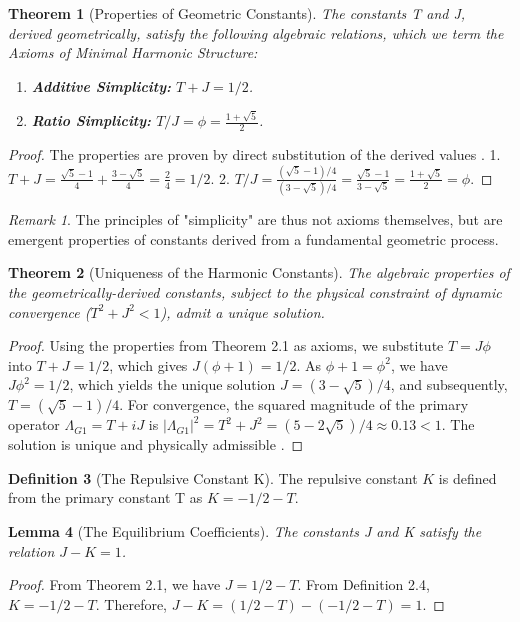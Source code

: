 \documentclass{article}
\theoremstyle{plain}
\newtheorem{theorem}{Theorem}[section]
\newtheorem{lemma}[theorem]{Lemma}
\theoremstyle{definition}
\newtheorem{definition}[theorem]{Definition}
\theoremstyle{remark}
\newtheorem*{remark}{Remark}
\begin{document}
\begin{theorem}[Properties of Geometric Constants]
The constants T and J, derived geometrically, satisfy the following algebraic relations, which we term the Axioms of Minimal Harmonic Structure:
\begin{enumerate}
    \item \textbf{Additive Simplicity:} $T+J = 1/2$.
    \item \textbf{Ratio Simplicity:} $T/J = \phi = \frac{1+\sqrt{5}}{2}$.
\end{enumerate}
\end{theorem}
\begin{proof}
The properties are proven by direct substitution of the derived values \textbf{}.
1. $T+J = \frac{\sqrt{5}-1}{4} + \frac{3-\sqrt{5}}{4} = \frac{2}{4} = 1/2$.
2. $T/J = \frac{(\sqrt{5}-1)/4}{(3-\sqrt{5})/4} = \frac{\sqrt{5}-1}{3-\sqrt{5}} = \frac{1+\sqrt{5}}{2} = \phi$.
\end{proof}

\begin{remark}
The principles of "simplicity" are thus not axioms themselves, but are emergent properties of constants derived from a fundamental geometric process.
\end{remark}

\begin{theorem}[Uniqueness of the Harmonic Constants]
The algebraic properties of the geometrically-derived constants, subject to the physical constraint of dynamic convergence ($T^2+J^2 < 1$), admit a unique solution.
\end{theorem}
\begin{proof}
Using the properties from Theorem 2.1 as axioms, we substitute $T=J\phi$ into $T+J=1/2$, which gives $J(\phi+1)=1/2$. As $\phi+1=\phi^2$, we have $J\phi^2=1/2$, which yields the unique solution $J=(3-\sqrt{5})/4$, and subsequently, $T=(\sqrt{5}-1)/4$. For convergence, the squared magnitude of the primary operator $\Lambda_{G1} = T+iJ$ is $|\Lambda_{G1}|^2 = T^2+J^2 = (5-2\sqrt{5})/4 \approx 0.13 < 1$. The solution is unique and physically admissible \textbf{}.
\end{proof}

\begin{definition}[The Repulsive Constant K]
The repulsive constant $K$ is defined from the primary constant T as $K = -1/2 - T$.
\end{definition}

\begin{lemma}[The Equilibrium Coefficients]
The constants J and K satisfy the relation $J-K=1$.
\end{lemma}
\begin{proof}
From Theorem 2.1, we have $J = 1/2 - T$. From Definition 2.4, $K = -1/2 - T$.
Therefore, $J-K = (1/2 - T) - (-1/2 - T) = 1$.
\end{proof}
\end{document}
